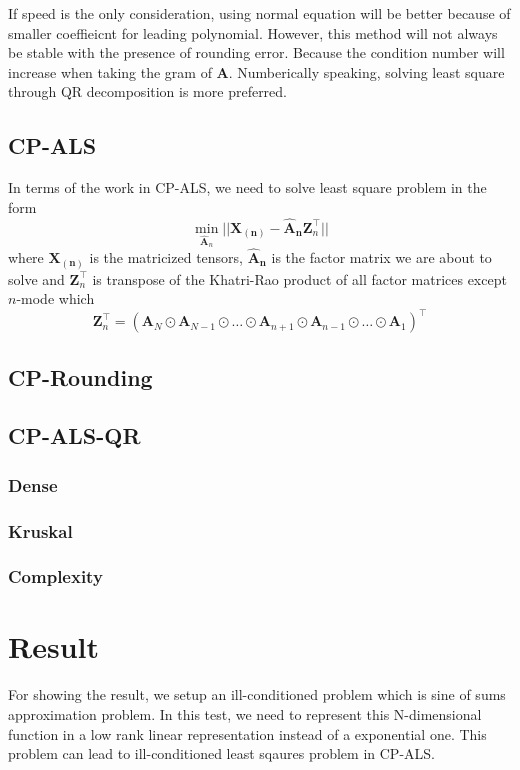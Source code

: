 \documentclass{article}
\newcommand{\mat}[1]{\mathbf{#1}}
\begin{document}
If speed is the only consideration, using normal equation will be better because of smaller coeffieicnt
for leading polynomial. However, this method will not always be stable with the presence of rounding error.
Because the condition number will increase when taking the gram of $\mat{A}$. Numberically speaking, solving least square through QR decomposition
is more preferred.





\subsection*{CP-ALS}
In terms of the work in CP-ALS, we need to solve least square problem in the form 
$$\min_{\mat{\hat{A}}_n}||\mat{X_{(n)}} - {\mat{\hat{A}_n}}\mat{Z}^\top_n ||$$
where $\mat{X_{(n)}}$ is the matricized tensors, $\mat{\hat{A}_n}$ is the factor matrix we are about to solve and 
$\mat{Z}^\top_n$ is transpose of the Khatri-Rao product of all factor matrices except $n$-mode which
$$\mat{Z}^\top_n = (\mat{A}_N \odot \mat{A}_{N-1} \odot \dots \odot \mat{A}_{n+1} \odot \mat{A}_{n-1} \odot \dots \odot \mat{A}_1)^\top $$ 


\subsection*{CP-Rounding}


\subsection*{CP-ALS-QR}
\subsubsection*{Dense}
\subsubsection*{Kruskal}
\subsubsection*{Complexity}




\section*{Result}
For showing the result, we setup an ill-conditioned problem which is sine of sums approximation problem.
In this test, we need to represent this N-dimensional function in a low rank linear representation instead of 
a exponential one. This problem can lead to ill-conditioned least sqaures problem in CP-ALS.
\end{document}
